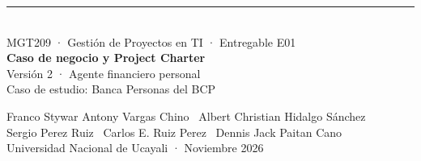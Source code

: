 \documentclass[aspectratio=169,11pt]{beamer}
\begin{document}
{
\begin{frame}[plain]
\vspace{0.22cm}
{\color{cobre}\rule{2.1cm}{2.2pt}}\\[0.35em]
{\color{crema}\normalsize MGT209 · Gestión de Proyectos en TI · Entregable E01}\\[0.1em]
{\color{white}\fontsize{22}{26}\selectfont\bfseries Caso de negocio y Project Charter}\\[0.12em]
{\color{crema}\large Versión 2 · Agente financiero personal}\\[0.08em]
{\color{crema}\normalsize Caso de estudio: Banca Personas del BCP}\\[0.4em]
\vspace{0.32cm}

{\color{crema}\footnotesize Franco Stywar Antony Vargas Chino \textperiodcentered\ Albert Christian Hidalgo Sánchez}\\[0.15em]
{\color{crema}\footnotesize Sergio Perez Ruiz \textperiodcentered\ Carlos E. Ruiz Perez \textperiodcentered\ Dennis Jack Paitan Cano}\\[0.28em]
{\color{crema}\scriptsize Universidad Nacional de Ucayali · Noviembre 2026}
\end{frame}
}
\end{document}
